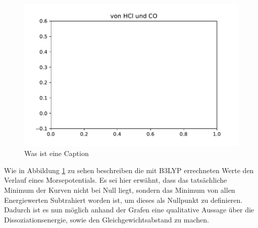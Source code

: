  
\begin{figure}[ht]
	\centering	
	\includegraphics[width=\columnwidth]{Bilder/b3lypzusammen}
	\caption{Was ist eine Caption}
	\label{b3lypzusammen}
\end{figure}


Wie in Abbildung \ref{b3lypzusammen} zu sehen beschreiben die mit B3LYP errechneten Werte den Verlauf eines Morsepotentials. Es sei hier erwähnt, dass das tatsächliche Minimum der Kurven nicht bei Null liegt, sondern das Minimum von allen Energiewerten Subtrahiert worden ist, um dieses als Nullpunkt zu definieren. Dadurch ist es nun möglich anhand der Grafen eine qualitative Aussage über die Dissoziationsenergie, sowie den Gleichgewichtsabstand zu machen.

  

